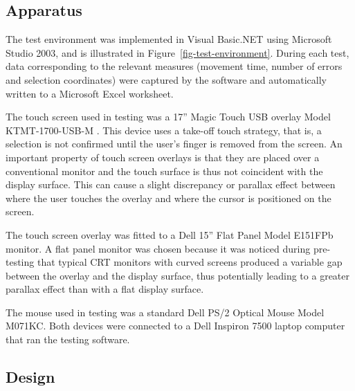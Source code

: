 \documentclass{elsart}
\begin{document}
\subsection{Apparatus}
\label{sec-method-apparatus}

The test environment was implemented in Visual Basic.NET using Microsoft
Studio 2003, and is illustrated in Figure~\ref{fig-test-environment}.
During each test, data corresponding to the relevant measures (movement
time, number of errors and selection coordinates) were captured by the
software and automatically written to a Microsoft Excel worksheet.

The touch screen used in testing was a 17'' Magic Touch USB overlay
Model KTMT-1700-USB-M \citep{Keyt-2005-Touch}. This device uses a
take-off touch strategy, that is, a selection is not confirmed until the
user's finger is removed from the screen. An important property of touch
screen overlays is that they are placed over a conventional monitor and
the touch surface is thus not coincident with the display surface. This
can cause a slight discrepancy or parallax effect between where the user
touches the overlay and where the cursor is positioned on the screen.

The touch screen overlay was fitted to a Dell 15'' Flat Panel Model
E151FPb monitor. A flat panel monitor was chosen because it was noticed
during pre-testing that typical CRT monitors with curved screens
produced a variable gap between the overlay and the display surface,
thus potentially leading to a greater parallax effect than with a flat
display surface.

The mouse used in testing was a standard Dell PS/2 Optical Mouse Model
M071KC. Both devices were connected to a Dell Inspiron 7500 laptop
computer that ran the testing software.


\subsection{Design}
\label{sec-method-design}
\end{document}
